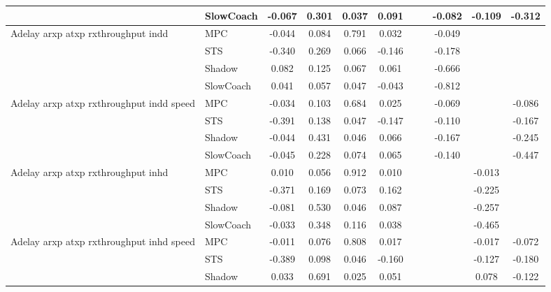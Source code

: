 \begin{tabular}{|l|l|*{9}{c|}}
                              & SlowCoach &   -0.067 &     0.301 &     0.037 &  0.091 &     &     &  -0.082 &  -0.109 &   -0.312 \\
\midrule
Adelay arxp atxp rxthroughput indd    & MPC &   -0.044 &     0.084 &     0.791 &  0.032 &     &     &  -0.049 &      &       \\
                              & STS &   -0.340 &     0.269 &     0.066 & -0.146 &     &     &  -0.178 &      &       \\
                              & Shadow &    0.082 &     0.125 &     0.067 &  0.061 &     &     &  -0.666 &      &       \\
                              & SlowCoach &    0.041 &     0.057 &     0.047 & -0.043 &     &     &  -0.812 &      &       \\
\midrule
Adelay arxp atxp rxthroughput indd speed    & MPC &   -0.034 &     0.103 &     0.684 &  0.025 &     &     &  -0.069 &      &   -0.086 \\
                              & STS &   -0.391 &     0.138 &     0.047 & -0.147 &     &     &  -0.110 &      &   -0.167 \\
                              & Shadow &   -0.044 &     0.431 &     0.046 &  0.066 &     &     &  -0.167 &      &   -0.245 \\
                              & SlowCoach &   -0.045 &     0.228 &     0.074 &  0.065 &     &     &  -0.140 &      &   -0.447 \\
\midrule
Adelay arxp atxp rxthroughput inhd    & MPC &    0.010 &     0.056 &     0.912 &  0.010 &     &     &      &  -0.013 &       \\
                              & STS &   -0.371 &     0.169 &     0.073 &  0.162 &     &     &      &  -0.225 &       \\
                              & Shadow &   -0.081 &     0.530 &     0.046 &  0.087 &     &     &      &  -0.257 &       \\
                              & SlowCoach &   -0.033 &     0.348 &     0.116 &  0.038 &     &     &      &  -0.465 &       \\
\midrule
Adelay arxp atxp rxthroughput inhd speed    & MPC &   -0.011 &     0.076 &     0.808 &  0.017 &     &     &      &  -0.017 &   -0.072 \\
                              & STS &   -0.389 &     0.098 &     0.046 & -0.160 &     &     &      &  -0.127 &   -0.180 \\
                              & Shadow &    0.033 &     0.691 &     0.025 &  0.051 &     &     &      &   0.078 &   -0.122 \\

\end{tabular}
